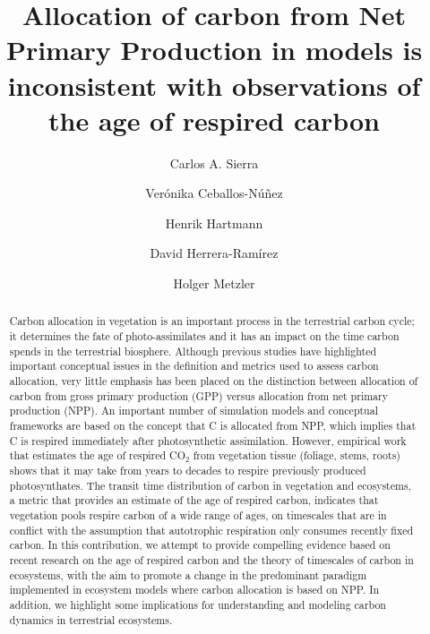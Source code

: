 \documentclass[12pt, a4paper]{article}
\title{\bf Allocation of carbon from Net Primary Production in models is inconsistent with observations of the age of respired carbon}
\author[1,2]{Carlos A. Sierra}
\author[3]{Ver\'onika Ceballos-N\'u\~nez}
\author[1]{Henrik Hartmann}
\author[1]{David Herrera-Ramírez}
\author[2]{Holger Metzler}
\affil[1]{Max Planck Institute for Biogeochemistry, 07745 Jena, Germany}
\affil[2]{Swedish University of Agricultural Sciences, 75651 Uppsala, Sweden}
\affil[3]{Leipzig University, 04103 Leipzig, Germany}
\date{} %
\begin{document}
\maketitle
\linenumbers

\begin{abstract} \noindent
Carbon allocation in vegetation is an important process in the terrestrial carbon cycle; it determines the fate of photo-assimilates and it has an impact on the time carbon spends in the terrestrial biosphere. Although previous studies have highlighted important conceptual issues in the definition and metrics used to assess carbon allocation, very little emphasis has been placed on the distinction between allocation of carbon from gross primary production (GPP) versus allocation from net primary production (NPP). An important number of simulation models and conceptual frameworks are based on the concept that C is allocated from NPP, which implies that C is respired immediately after photosynthetic assimilation. However, empirical work that estimates the age of respired CO$_2$ from vegetation tissue (foliage, stems, roots) shows that it may take from years to decades to respire previously produced photosynthates. The transit time distribution of carbon in vegetation and ecosystems, a metric that provides an estimate of the age of respired carbon, indicates that vegetation pools respire carbon of a wide range of ages, on timescales that are in conflict with the assumption that autotrophic respiration only consumes recently fixed carbon. In this contribution, we attempt to provide compelling evidence based on recent research on the age of respired carbon and the theory of timescales of carbon in ecosystems, with the aim to promote a change in the predominant paradigm implemented in ecosystem models where carbon allocation is based on NPP. In addition, we highlight some implications for understanding and modeling carbon dynamics in terrestrial ecosystems. 
\end{abstract}
\end{document}
